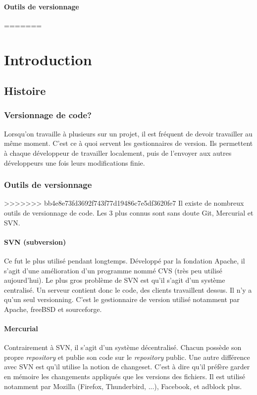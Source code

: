 \documentclass[a4paper,10pt]{report}
\begin{document}
    \subsubsection{Outils de versionnage}
=======
\chapter{Introduction}
  \section{Histoire}
    \subsection{Versionnage de code?}
Lorsqu'on travaille \`a plusieurs sur un projet, il est fr\'equent de devoir travailler au m\^eme moment. C'est ce \`a quoi servent les gestionnaires de version. Ils permettent \`a chaque d\'eveloppeur de travailler localement, puis de l'envoyer aux autres d\'eveloppeurs une fois leurs modifications finie.
    \subsection{Outils de versionnage}
>>>>>>> bb4e8e73fd3692f743f77d19486c7e5df3620fe7
Il existe de nombreux outils de versionnage de code. Les 3 plus connus sont sans doute Git, Mercurial et SVN.
      \subsubsection{SVN (subversion)}
Ce fut le plus utilisé pendant longtemps. Développé par la fondation Apache, il s'agit d'une amélioration d'un programme nommé CVS (très peu utilisé aujourd'hui). Le plus gros problème de SVN est qu'il s'agit d'un système centralisé. Un serveur contient donc le code, des clients travaillent dessus. Il n'y a qu'un seul versionning. C'est le gestionnaire de version utilis\'e notamment par Apache, freeBSD et sourceforge.
      \subsubsection{Mercurial}
Contrairement à SVN, il s'agit d'un système décentralisé. Chacun possède son propre \emph{repository} et publie son code sur le \emph{repository} public. Une autre différence avec SVN est qu'il utilise la notion de changeset. C'est à dire qu'il préfère garder en mémoire les changements appliqués que les versions des fichiers. Il est utilis\'e notamment par Mozilla (Firefox, Thunderbird, ...), Facebook, et adblock plus.
\end{document}
